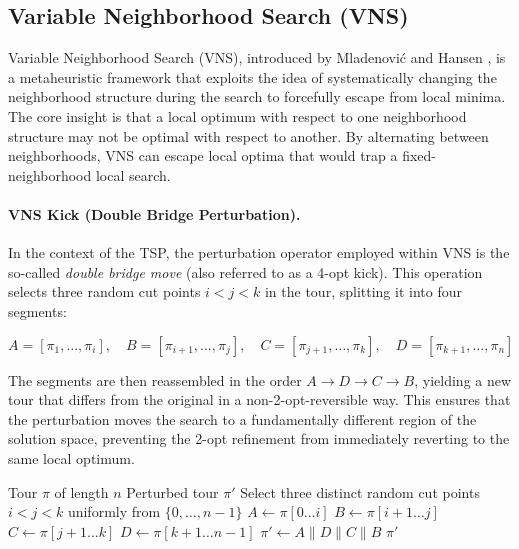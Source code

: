\documentclass{article}
\begin{document}

\subsection{Variable Neighborhood Search (VNS)}

Variable Neighborhood Search (VNS), introduced by Mladenović and Hansen
\cite{mladenovic1997variable}, is a metaheuristic framework that exploits the idea of
systematically changing the neighborhood structure during the search to forcefully escape from local minima. The core insight is
that a local optimum with respect to one neighborhood structure may not be optimal with
respect to another. By alternating between neighborhoods, VNS can escape local optima that
would trap a fixed-neighborhood local search.

\paragraph{VNS Kick (Double Bridge Perturbation).}
In the context of the TSP, the perturbation operator employed within VNS is the so-called
\textit{double bridge move} (also referred to as a 4-opt kick). This operation selects three
random cut points $i < j < k$ in the tour, splitting it into four segments:

\[
A = [\pi_1, \ldots, \pi_i], \quad B = [\pi_{i+1}, \ldots, \pi_j],
\quad C = [\pi_{j+1}, \ldots, \pi_k], \quad D = [\pi_{k+1}, \ldots, \pi_n]
\]

The segments are then reassembled in the order $A \to D \to C \to B$, yielding a new tour
that differs from the original in a non-2-opt-reversible way. This ensures that the
perturbation moves the search to a fundamentally different region of the solution space,
preventing the 2-opt refinement from immediately reverting to the same local optimum.

\begin{algorithm}[H]
\caption{Double Bridge Kick (VNS Perturbation)}
\label{alg:vns_kick}
\begin{algorithmic}[1]
\Require Tour $\pi$ of length $n$
\Ensure Perturbed tour $\pi'$
\State Select three distinct random cut points $i < j < k$ uniformly from $\{0, \ldots, n-1\}$
\State $A \leftarrow \pi[0 \ldots i]$
\State $B \leftarrow \pi[i{+}1 \ldots j]$
\State $C \leftarrow \pi[j{+}1 \ldots k]$
\State $D \leftarrow \pi[k{+}1 \ldots n{-}1]$
\State $\pi' \leftarrow A \| D \| C \| B$ 
\State \Return $\pi'$
\end{algorithmic}
\end{algorithm}
\end{document}
